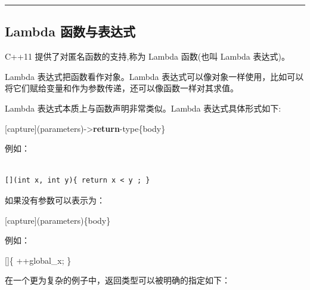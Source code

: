 \documentclass[
]{article}
\newenvironment{Shaded}{}{}
\newcommand{\ControlFlowTok}[1]{\textcolor[rgb]{0.00,0.44,0.13}{\textbf{#1}}}
\newcommand{\NormalTok}[1]{#1}
\newcommand{\OperatorTok}[1]{\textcolor[rgb]{0.40,0.40,0.40}{#1}}
\begin{document}
\begin{center}\rule{0.5\linewidth}{0.5pt}\end{center}

\hypertarget{lambda-ux51fdux6570ux4e0eux8868ux8fbeux5f0f}{%
\subsection{Lambda
函数与表达式}\label{lambda-ux51fdux6570ux4e0eux8868ux8fbeux5f0f}}

C++11 提供了对匿名函数的支持,称为 Lambda 函数(也叫 Lambda 表达式)。

Lambda 表达式把函数看作对象。Lambda
表达式可以像对象一样使用，比如可以将它们赋给变量和作为参数传递，还可以像函数一样对其求值。

Lambda 表达式本质上与函数声明非常类似。Lambda 表达式具体形式如下:

\begin{Shaded}
\begin{Highlighting}[]
\OperatorTok{[}\NormalTok{capture}\OperatorTok{](}\NormalTok{parameters}\OperatorTok{){-}\textgreater{}}\ControlFlowTok{return}\OperatorTok{{-}}\NormalTok{type}\OperatorTok{\{}\NormalTok{body}\OperatorTok{\}}
\end{Highlighting}
\end{Shaded}

例如：

\begin{verbatim}
 
[](int x, int y){ return x < y ; }
\end{verbatim}

如果没有参数可以表示为：

\begin{Shaded}
\begin{Highlighting}[]
\OperatorTok{[}\NormalTok{capture}\OperatorTok{](}\NormalTok{parameters}\OperatorTok{)\{}\NormalTok{body}\OperatorTok{\}}
\end{Highlighting}
\end{Shaded}

例如：

\begin{Shaded}
\begin{Highlighting}[]
\OperatorTok{[]\{} \OperatorTok{++}\NormalTok{global\_x}\OperatorTok{;} \OperatorTok{\}}
\end{Highlighting}
\end{Shaded}

在一个更为复杂的例子中，返回类型可以被明确的指定如下：
\end{document}
